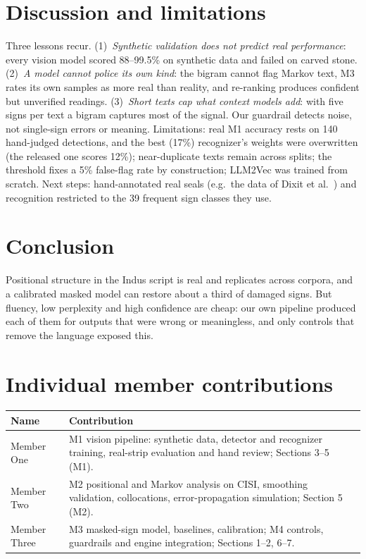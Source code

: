 \documentclass[11pt,a4paper,twocolumn]{article}
\begin{document}
\section{Discussion and limitations}
Three lessons recur. (1)~\emph{Synthetic validation does not predict real performance}: every vision
model scored 88--99.5\% on synthetic data and failed on carved stone. (2)~\emph{A model cannot police
its own kind}: the bigram cannot flag Markov text, M3 rates its own samples as more real than reality,
and re-ranking produces confident but unverified readings. (3)~\emph{Short texts cap what context
models add}: with five signs per text a bigram captures most of the signal. Our guardrail detects noise, not single-sign errors or meaning.
Limitations: real M1 accuracy rests on 140 hand-judged detections, and the best (17\%) recognizer's
weights were overwritten (the released one scores 12\%); near-duplicate texts remain across splits;
the threshold fixes a 5\% false-flag rate by construction; LLM2Vec was trained from scratch. Next steps: hand-annotated real seals (e.g.\ the data of
Dixit et al.~\cite{dixit2025}) and recognition restricted to the 39 frequent sign classes they use.

\section{Conclusion}
Positional structure in the Indus script is real and replicates across corpora, and a calibrated masked
model can restore about a third of damaged signs. But fluency, low perplexity and high confidence are
cheap: our own pipeline produced each of them for outputs that were wrong or meaningless, and only
controls that remove the language exposed this.

\section*{Individual member contributions}
{\small
\begin{tabularx}{\linewidth}{@{}l X@{}}
\toprule
Name & Contribution \\
\midrule
Member One & M1 vision pipeline: synthetic data, detector and recognizer training, real-strip evaluation and hand review; Sections 3--5 (M1). \\
Member Two & M2 positional and Markov analysis on CISI, smoothing validation, collocations, error-propagation simulation; Section 5 (M2). \\
Member Three & M3 masked-sign model, baselines, calibration; M4 controls, guardrails and engine integration; Sections 1--2, 6--7. \\
\bottomrule
\end{tabularx}}
\end{document}
